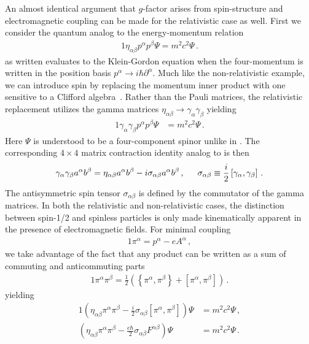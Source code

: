 An almost identical argument that $g$-factor arises from spin-structure and electromagnetic coupling can be made for the relativistic case as well. First we consider the quantum analog to the energy-momentum relation
\begin{alignat}{1}
	\label{analog:1} \eta_{\alpha\beta}p^{\alpha}p^{\beta}\Psi=m^{2}c^{2}\Psi\,.
\end{alignat}
 as written evaluates to the Klein-Gordon equation when the four-momentum is written in the position basis $p^{\alpha}\rightarrow i\hbar\partial^{\alpha}$. Much like the non-relativistic example, we can introduce spin by replacing the momentum inner product with one sensitive to a Clifford algebra~\citep{Weinberg:1995mt}. Rather than the Pauli matrices, the relativistic replacement utilizes the gamma matrices $\eta_{\alpha\beta}\rightarrow\gamma_{\alpha}\gamma_{\beta}$ yielding
\begin{alignat}{1}
	\label{eq:spin:03} \gamma_{\alpha}\gamma_{\beta}p^{\alpha}p^{\beta}\Psi&=m^{2}c^{2}\Psi\,.
\end{alignat}
Here $\Psi$ is understood to be a four-component spinor unlike in . The corresponding $4\times4$ matrix contraction identity analog to  is then
\begin{alignat}{1}
	\label{eq:spin:04} \gamma_{\alpha}\gamma_{\beta}a^{\alpha}b^{\beta}=\eta_{\alpha\beta}a^{\alpha}b^{\beta}-i\sigma_{\alpha\beta}a^{\alpha}b^{\beta}\,,\indent \sigma_{\alpha\beta}\equiv\frac{i}{2}\left[\gamma_{\alpha},\gamma_{\beta}\right]\,.
\end{alignat}
The antisymmetric spin tensor $\sigma_{\alpha\beta}$ is defined by the commutator of the gamma matrices. In both the relativistic and non-relativistic cases, the distinction between spin-1/2 and spinless particles is only made kinematically apparent in the presence of electromagnetic fields. For minimal coupling
\begin{alignat}{1}
  \label{eq:spin:05} \pi^{\alpha}=p^{\alpha}-eA^{\alpha}\,,
\end{alignat}
we take advantage of the fact that any product can be written as a sum of commuting and anticommuting parts
\begin{alignat}{1}
	\label{eq:spin:06} \pi^{\alpha}\pi^{\beta}=\frac{1}{2}\left(\left\{\pi^{\alpha},\pi^{\beta}\right\}+\left[\pi^{\alpha},\pi^{\beta}\right]\right)\,.
\end{alignat}
yielding
\begin{alignat}{1}
	\label{eq:spin:07a} \left(\eta_{\alpha\beta}\pi^{\alpha}\pi^{\beta}-\frac{i}{2}\sigma_{\alpha\beta}\left[\pi^{\alpha},\pi^{\beta}\right]\right)\Psi&=m^{2}c^{2}\Psi\,,\\
	\label{eq:spin:07b} \left(\eta_{\alpha\beta}\pi^{\alpha}\pi^{\beta}-\frac{e\hbar}{2}\sigma_{\alpha\beta}F^{\alpha\beta}\right)\Psi&=m^{2}c^{2}\Psi\,.
\end{alignat}
